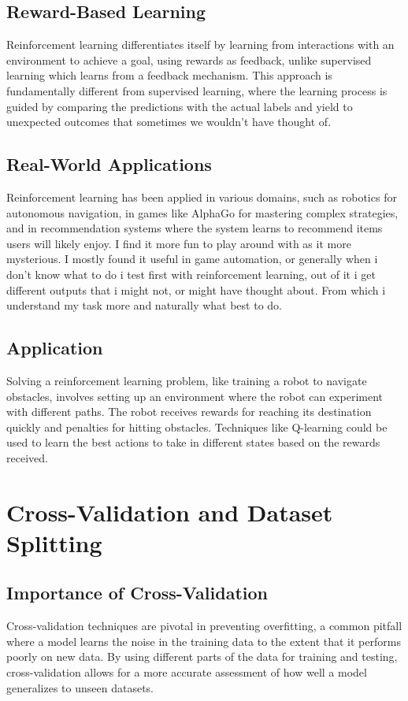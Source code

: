 \documentclass[11pt]{article}
\begin{document}
\subsection{Reward-Based Learning}
Reinforcement learning differentiates itself by learning from interactions with an environment to achieve a goal, using rewards as feedback, unlike supervised learning which learns from a feedback mechanism. This approach is fundamentally different from supervised learning, where the learning process is guided by comparing the predictions with the actual labels and yield to unexpected outcomes that sometimes we wouldn't have thought of.

\subsection{Real-World Applications}
Reinforcement learning has been applied in various domains, such as robotics for autonomous navigation, in games like AlphaGo for mastering complex strategies, and in recommendation systems where the system learns to recommend items users will likely enjoy. I find it more fun to play around with as it more mysterious. I mostly found it useful in game automation, or generally when i don't know what to do i test first with reinforcement learning, out of it i get different outputs that i might not, or might have thought about. From which i understand my task more and naturally what best to do.

\subsection{Application}
Solving a reinforcement learning problem, like training a robot to navigate obstacles, involves setting up an environment where the robot can experiment with different paths. The robot receives rewards for reaching its destination quickly and penalties for hitting obstacles. Techniques like Q-learning could be used to learn the best actions to take in different states based on the rewards received.

\section{Cross-Validation and Dataset Splitting}

\subsection{Importance of Cross-Validation}
Cross-validation techniques are pivotal in preventing overfitting, a common pitfall where a model learns the noise in the training data to the extent that it performs poorly on new data. By using different parts of the data for training and testing, cross-validation allows for a more accurate assessment of how well a model generalizes to unseen datasets.
\end{document}
